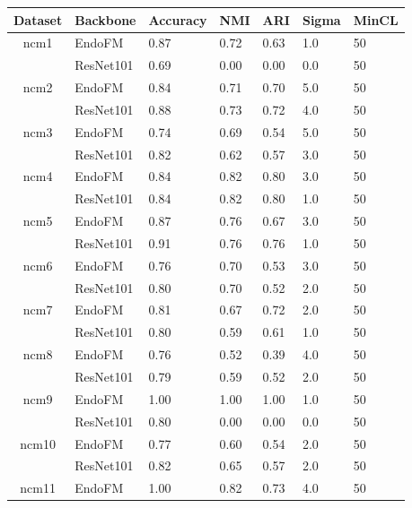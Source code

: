 \begin{table}[h]
\small
\setlength\tabcolsep{3pt}
    \centering
    \vspace{-0.05in}
    \begin{tabular}{cllllll}
    \toprule
        Dataset & Backbone & Accuracy & NMI & ARI & Sigma & MinCL \\
        \midrule
    \multirow{2}{*}{ncm1}
 & EndoFM & 0.87 & 0.72 & 0.63 & 1.0 & 50 \\
     & ResNet101 & 0.69 & 0.00 & 0.00 & 0.0 & 50 \\
    \midrule
    \multirow{2}{*}{ncm2}
 & EndoFM & 0.84 & 0.71 & 0.70 & 5.0 & 50 \\
     & ResNet101 & 0.88 & 0.73 & 0.72 & 4.0 & 50 \\
    \midrule
    \multirow{2}{*}{ncm3}
 & EndoFM & 0.74 & 0.69 & 0.54 & 5.0 & 50 \\
     & ResNet101 & 0.82 & 0.62 & 0.57 & 3.0 & 50 \\
    \midrule
    \multirow{2}{*}{ncm4}
 & EndoFM & 0.84 & 0.82 & 0.80 & 3.0 & 50 \\
     & ResNet101 & 0.84 & 0.82 & 0.80 & 1.0 & 50 \\
    \midrule
    \multirow{2}{*}{ncm5}
 & EndoFM & 0.87 & 0.76 & 0.67 & 3.0 & 50 \\
     & ResNet101 & 0.91 & 0.76 & 0.76 & 1.0 & 50 \\
    \midrule
    \multirow{2}{*}{ncm6}
 & EndoFM & 0.76 & 0.70 & 0.53 & 3.0 & 50 \\
     & ResNet101 & 0.80 & 0.70 & 0.52 & 2.0 & 50 \\
    \midrule
    \multirow{2}{*}{ncm7}
 & EndoFM & 0.81 & 0.67 & 0.72 & 2.0 & 50 \\
     & ResNet101 & 0.80 & 0.59 & 0.61 & 1.0 & 50 \\
    \midrule
    \multirow{2}{*}{ncm8}
 & EndoFM & 0.76 & 0.52 & 0.39 & 4.0 & 50 \\
     & ResNet101 & 0.79 & 0.59 & 0.52 & 2.0 & 50 \\
    \midrule
    \multirow{2}{*}{ncm9}
 & EndoFM & 1.00 & 1.00 & 1.00 & 1.0 & 50 \\
     & ResNet101 & 0.80 & 0.00 & 0.00 & 0.0 & 50 \\
    \midrule
    \multirow{2}{*}{ncm10}
 & EndoFM & 0.77 & 0.60 & 0.54 & 2.0 & 50 \\
     & ResNet101 & 0.82 & 0.65 & 0.57 & 2.0 & 50 \\
    \midrule
    \multirow{2}{*}{ncm11}
 & EndoFM & 1.00 & 0.82 & 0.73 & 4.0 & 50 \\

\end{tabular}
\end{table}
